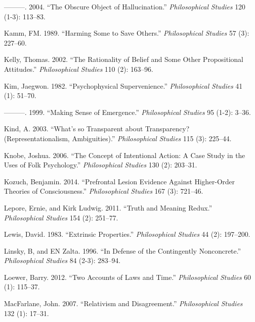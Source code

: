 \documentclass[
  10pt,
  letterpaper,
  DIV=11,
  numbers=noendperiod,
  twoside]{scrartcl}
\newlength{\cslhangindent}
\newenvironment{CSLReferences}[2] %
 {\begin{list}{}{%
  \setlength{\itemindent}{0pt}
  \setlength{\leftmargin}{0pt}
  \setlength{\parsep}{0pt}
  \ifodd #1
   \setlength{\leftmargin}{\cslhangindent}
   \setlength{\itemindent}{-1\cslhangindent}
  \fi
  \setlength{\itemsep}{#2\baselineskip}}}
 {\end{list}}
\begin{document}
\begin{CSLReferences}{1}{0}
---------. 2004. {``The Obscure Object of Hallucination.''}
\emph{Philosophical Studies} 120 (1-3): 113--83.

Kamm, FM. 1989. {``Harming Some to Save Others.''} \emph{Philosophical
Studies} 57 (3): 227--60.

Kelly, Thomas. 2002. {``The Rationality of Belief and Some Other
Propositional Attitudes.''} \emph{Philosophical Studies} 110 (2):
163--96.

Kim, Jaegwon. 1982. {``Psychophysical Supervenience.''}
\emph{Philosophical Studies} 41 (1): 51--70.

---------. 1999. {``Making Sense of Emergence.''} \emph{Philosophical
Studies} 95 (1-2): 3--36.

Kind, A. 2003. {``What's so Transparent about Transparency?
(Representationalism, Ambiguities).''} \emph{Philosophical Studies} 115
(3): 225--44.

Knobe, Joshua. 2006. {``The Concept of Intentional Action: A Case Study
in the Uses of Folk Psychology.''} \emph{Philosophical Studies} 130 (2):
203--31.

Kozuch, Benjamin. 2014. {``Prefrontal Lesion Evidence Against
Higher-Order Theories of Consciousness.''} \emph{Philosophical Studies}
167 (3): 721--46.

Lepore, Ernie, and Kirk Ludwig. 2011. {``Truth and Meaning Redux.''}
\emph{Philosophical Studies} 154 (2): 251--77.

Lewis, David. 1983. {``Extrinsic Properties.''} \emph{Philosophical
Studies} 44 (2): 197--200.

Linsky, B, and EN Zalta. 1996. {``In Defense of the Contingently
Nonconcrete.''} \emph{Philosophical Studies} 84 (2-3): 283--94.

Loewer, Barry. 2012. {``Two Accounts of Laws and Time.''}
\emph{Philosophical Studies} 60 (1): 115--37.

MacFarlane, John. 2007. {``Relativism and Disagreement.''}
\emph{Philosophical Studies} 132 (1): 17--31.


\end{CSLReferences}
\end{document}
